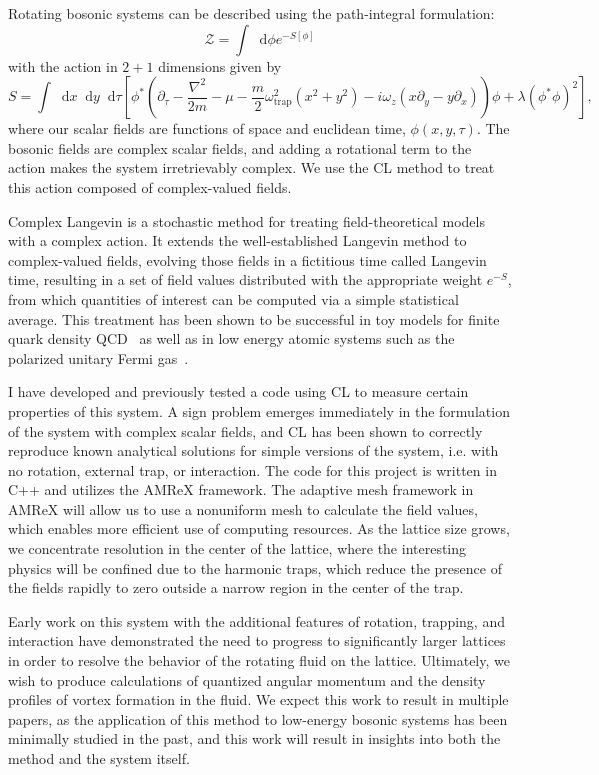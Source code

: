 \documentclass[onecolumn, 12pt]{article}
\newcommand{\beq}{\begin{equation}}
\newcommand{\eeq}{\end{equation}}
\def\CZ{{\mathcal Z}}
\def\del{{\nabla}}
\newcommand*\dif{\mathop{}\!\mathrm{d}}
\begin{document}
Rotating bosonic systems can be described using the path-integral formulation:
%
\beq
\CZ = \int \dif \phi e^{-S[\phi]}
\eeq
%
with the action in $2+1$ dimensions given by
%
\beq
S = \int \dif x \dif y \dif\tau \left[ \phi^{*}\left( \partial_{\tau} - \frac{\del^{2}}{2m} - \mu  - \frac{m}{2} \omega_{\text{trap}}^{2}(x^{2}+y^{2})- i \omega_{z}(x \partial_{y} - y\partial_{x})\right)\phi + \lambda (\phi^{*} \phi)^{2}\right],
\eeq 
%
where our scalar fields are functions of space and euclidean time, $\phi(x,y,\tau)$. The bosonic fields are complex scalar fields, and adding a rotational term to the action makes the system irretrievably complex. We use the CL method to treat this action composed of complex-valued fields.

Complex Langevin is a stochastic method for treating field-theoretical models with a complex action. It extends the well-established Langevin method to complex-valued fields, evolving those fields in a fictitious time called Langevin time, resulting in a set of field values distributed with the appropriate weight $e^{-S}$, from which quantities of interest can be computed via a simple statistical average. This treatment has been shown to be successful in toy models for finite quark density QCD~\cite{BergerCLReview} as well as in low energy atomic systems such as the polarized unitary Fermi gas~\cite{BergerCLReview}. 

I have developed and previously tested a code using CL to measure certain properties of this system. A sign problem emerges immediately in the formulation of the system with complex scalar fields, and CL has been shown to correctly reproduce known analytical solutions for simple versions of the system, i.e. with no rotation, external trap, or interaction. The code for this project is written in C++ and utilizes the AMReX framework. The adaptive mesh framework in AMReX will allow us to use a nonuniform mesh to calculate the field values, which enables more efficient use of computing resources. As the lattice size grows, we concentrate resolution in the center of the lattice, where the interesting physics will be confined due to the harmonic traps, which reduce the presence of the fields rapidly to zero outside a narrow region in the center of the trap.

Early work on this system with the additional features of rotation, trapping, and interaction have demonstrated the need to progress to significantly larger lattices in order to resolve the behavior of the rotating fluid on the lattice. Ultimately, we wish to produce calculations of quantized angular momentum and the density profiles of vortex formation in the fluid.
We expect this work to result in multiple papers, as the application of this method to low-energy bosonic systems has been minimally studied in the past, and this work will result in insights into both the method and the system itself.
\end{document}

